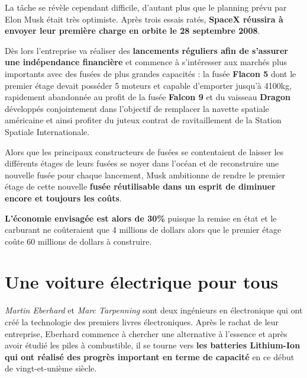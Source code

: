 \vspace{5mm}

La tâche se révèle cependant difficile, d'autant plus que le planning prévu par Elon Musk était très optimiste. Après trois essais ratés, \textbf{SpaceX réussira à envoyer leur première charge en orbite le 28 septembre 2008}.

\vspace{5mm}

Dès lors l'entreprise va réaliser des \textbf{lancements réguliers afin de s'assurer une indépendance financière} et commence à s'intéresser aux marchés plus importants avec des fusées de plus grandes capacités : la fusée \textbf{Flacon 5} dont le premier étage devait posséder 5 moteurs et capable d'emporter jusqu'à 4100kg, rapidement abandonnée au profit de la fusée \textbf{Falcon 9} et du vaisseau \textbf{Dragon} développés conjointement dans l'objectif de remplacer la navette spatiale américaine et ainsi profiter du juteux contrat de ravitaillement de la Station Spatiale Internationale.

\vspace{5mm}

Alors que les principaux constructeurs de fusées se contentaient de laisser les différents étages de leurs fusées se noyer dans l'océan et de reconstruire une nouvelle fusée pour chaque lancement, Musk ambitionne de rendre le premier étage de cette nouvelle \textbf{fusée réutilisable dans un esprit de diminuer encore et toujours les coûts}\supercite{MuskAmbitionReusableFalcon9}.

\textbf{L'économie envisagée est alors de 30\%} puisque la remise en état et le carburant ne coûteraient que 4 millions de dollars alors que le premier étage coûte 60 millions de dollars à construire\supercite{SpaceXReusable30Percent}.

\section{Une voiture électrique pour tous}

\textit{Martin Eberhard} et \textit{Marc Tarpenning} sont deux ingénieurs en électronique qui ont créé la technologie des premiers livres électroniques. Après le rachat de leur entreprise, Eberhard commence à chercher une alternative à l'essence et après avoir étudié les piles à combustible, il se tourne vers \textbf{les batteries Lithium-Ion qui ont réalisé des progrès important en terme de capacité} en ce début de vingt-et-unième siècle.

